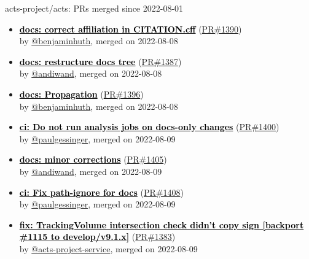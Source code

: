 \documentclass{beamer}
\begin{document}
\begin{frame}[allowframebreaks]{ acts-project/acts: PRs merged since 2022-08-01 }
\begin{itemize}
    \item
    \textbf{\href{https://github.com/acts-project/acts/pull/1390}{\textcolor{black}{docs: correct affiliation in CITATION.cff}}}
    (\href{https://github.com/acts-project/acts/pull/1390}{PR\#1390}) \\
    by \href{https://github.com/benjaminhuth}{ @benjaminhuth}, merged on 2022-08-08

    \item
    \textbf{\href{https://github.com/acts-project/acts/pull/1387}{\textcolor{black}{docs: restructure docs tree}}}
    (\href{https://github.com/acts-project/acts/pull/1387}{PR\#1387}) \\
    by \href{https://github.com/andiwand}{ @andiwand}, merged on 2022-08-08

    \item
    \textbf{\href{https://github.com/acts-project/acts/pull/1396}{\textcolor{black}{docs: Propagation}}}
    (\href{https://github.com/acts-project/acts/pull/1396}{PR\#1396}) \\
    by \href{https://github.com/benjaminhuth}{ @benjaminhuth}, merged on 2022-08-08

    \item
    \textbf{\href{https://github.com/acts-project/acts/pull/1400}{\textcolor{black}{ci: Do not run analysis jobs on docs-only changes}}}
    (\href{https://github.com/acts-project/acts/pull/1400}{PR\#1400}) \\
    by \href{https://github.com/paulgessinger}{ @paulgessinger}, merged on 2022-08-09

    \item
    \textbf{\href{https://github.com/acts-project/acts/pull/1405}{\textcolor{black}{docs: minor corrections}}}
    (\href{https://github.com/acts-project/acts/pull/1405}{PR\#1405}) \\
    by \href{https://github.com/andiwand}{ @andiwand}, merged on 2022-08-09

    \item
    \textbf{\href{https://github.com/acts-project/acts/pull/1408}{\textcolor{black}{ci: Fix path-ignore for docs}}}
    (\href{https://github.com/acts-project/acts/pull/1408}{PR\#1408}) \\
    by \href{https://github.com/paulgessinger}{ @paulgessinger}, merged on 2022-08-09

    \item
    \textbf{\href{https://github.com/acts-project/acts/pull/1383}{\textcolor{black}{fix: TrackingVolume intersection check didn't copy sign [backport \#1115 to develop/v9.1.x]}}}
    (\href{https://github.com/acts-project/acts/pull/1383}{PR\#1383}) \\
    by \href{https://github.com/acts-project-service}{ @acts-project-service}, merged on 2022-08-09


\end{itemize}
\end{frame}
\end{document}
